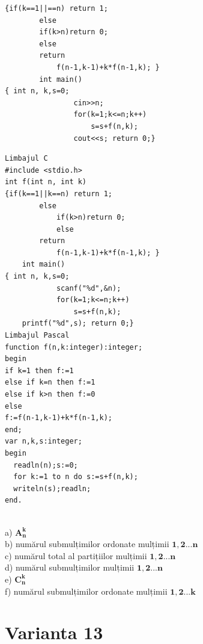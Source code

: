 {{\begin{verbatim}
{if(k==1||==n) return 1;
        else
        if(k>n)return 0;
        else
        return
            f(n-1,k-1)+k*f(n-1,k); }
        int main()
{ int n, k,s=0;
                cin>>n;
                for(k=1;k<=n;k++)
                    s=s+f(n,k);
                cout<<s; return 0;}
\end{verbatim}
\begin{verbatim}
Limbajul C
#include <stdio.h>
int f(int n, int k)
{if(k==1||k==n) return 1;
        else
            if(k>n)return 0;
            else
        return
            f(n-1,k-1)+k*f(n-1,k); }
    int main()
{ int n, k,s=0;
            scanf("%d",&n);
            for(k=1;k<=n;k++)
                s=s+f(n,k);
    printf("%d",s); return 0;}
Limbajul Pascal 
function f(n,k:integer):integer; 
begin 
if k=1 then f:=1 
else if k=n then f:=1 
else if k>n then f:=0 
else 
f:=f(n-1,k-1)+k*f(n-1,k);  
end; 
var n,k,s:integer; 
begin 
  readln(n);s:=0; 
  for k:=1 to n do s:=s+f(n,k); 
  writeln(s);readln; 
end. 
\end{verbatim}
\\
a) $\boldsymbol{A}_{\boldsymbol{n}}^{\boldsymbol{k}}$
\\
b) numărul submulțimilor ordonate mulțimii ${\mathbf{1 , 2 . . . n }}$
\\
c) numărul total al partițiilor mulțimii ${\mathbf{1 , 2 . . . \mathbf { n } }}$
\\
d) numărul submulțimilor mulțimii ${\mathbf{1 , 2} . . . \mathbf{n}}$
\\
e) $\boldsymbol{C}_{\boldsymbol{n}}^{\boldsymbol{k}}$
\\
f) numărul submulțimilor ordonate mulțimii ${\mathbf{1 , 2 . . . k}}$
\\

\section*{Varianta 13}

}}
